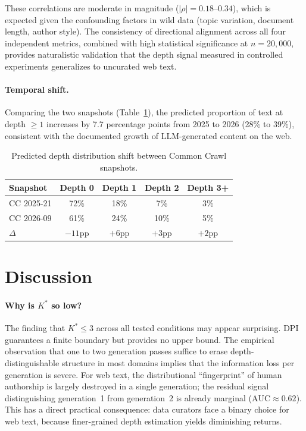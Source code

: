\documentclass[11pt,a4paper]{article}
\begin{document}
These correlations are moderate in magnitude ($|\rho| = 0.18$--$0.34$), which is expected given the confounding factors in wild data (topic variation, document length, author style). The consistency of directional alignment across all four independent metrics, combined with high statistical significance at $n = 20{,}000$, provides naturalistic validation that the depth signal measured in controlled experiments generalizes to uncurated web text.

\paragraph{Temporal shift.} Comparing the two snapshots (Table~\ref{tab:temporal}), the predicted proportion of text at depth $\ge 1$ increases by 7.7 percentage points from 2025 to 2026 (28\% to 39\%), consistent with the documented growth of LLM-generated content on the web.

\begin{table}[t]
\centering
\small
\caption{Predicted depth distribution shift between Common Crawl snapshots.}
\label{tab:temporal}
\begin{tabular}{lcccc}
\toprule
\textbf{Snapshot} & \textbf{Depth 0} & \textbf{Depth 1} & \textbf{Depth 2} & \textbf{Depth 3+} \\
\midrule
CC 2025-21 & 72\% & 18\% & 7\% & 3\% \\
CC 2026-09 & 61\% & 24\% & 10\% & 5\% \\
$\Delta$    & $-11$pp & $+6$pp & $+3$pp & $+2$pp \\
\bottomrule
\end{tabular}
\end{table}


\section{Discussion}

\paragraph{Why is $K^*$ so low?}
The finding that $K^* \le 3$ across all tested conditions may appear surprising. DPI guarantees a finite boundary but provides no upper bound. The empirical observation that one to two generation passes suffice to erase depth-distinguishable structure in most domains implies that the information loss per generation is severe. For web text, the distributional ``fingerprint'' of human authorship is largely destroyed in a single generation; the residual signal distinguishing generation~1 from generation~2 is already marginal ($\text{AUC} \approx 0.62$). This has a direct practical consequence: data curators face a binary choice for web text, because finer-grained depth estimation yields diminishing returns.
\end{document}
